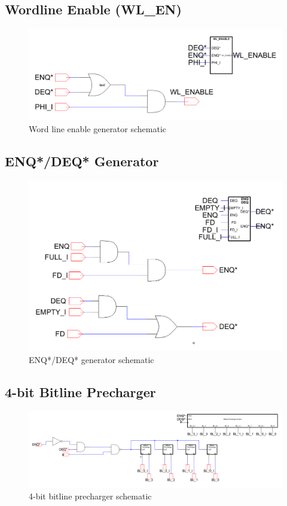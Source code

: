 \documentclass[12pt]{report}
\begin{document}
\subsection*{Wordline Enable (WL\_EN)}
\begin{figure}[H]
  \centering
    \includegraphics[width=1.0\textwidth]{Schematics/wl_enable_schematic.PNG}
  \caption{Word line enable generator schematic}
  \label{fig:wl_enable_schematic}
\end{figure}

\subsection*{ENQ*/DEQ* Generator}
\begin{figure}[H]
  \centering
    \includegraphics[width=1.0\textwidth]{Schematics/enqueue_dequeue_schematic.PNG}
  \caption{ENQ*/DEQ* generator schematic}
  \label{fig:enqueue_dequeue_schematic}
\end{figure}

\subsection*{4-bit Bitline Precharger}
\begin{figure}[H]
  \centering
    \includegraphics[width=1.0\textwidth]{Schematics/4_bit_precharge_schematic.PNG}
  \caption{4-bit bitline precharger schematic}
  \label{fig:4_bit_precharge_schematic}
\end{figure}
\end{document}
